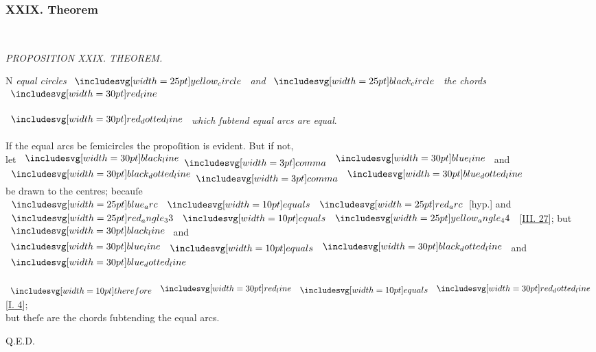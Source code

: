 \documentclass[11pt,preview]{standalone}
\begin{document}
\subsubsection{XXIX. Theorem}

\begin{minipage}[t]{0.43\textwidth}
    \vspace{20pt}
    
    \hfill\\
    
\end{minipage}%
\hfill
\begin{minipage}[t]{0.54\textwidth}
    \begin{center}
        \textit{PROPOSITION XXIX. THEOREM.}\label{book3pr29} \\
    \end{center}

    \hfill

    \begin{center}
        \raggedright \lettrine[lines=3, loversize=1, nindent=0pt]{}{}N \textit{equal circles} $\img{yellow_circle}$ \textit{and} $\img{black_circle}$ \textit{the chords} $\redline$
    \end{center}
    $\dottedredline$ \textit{which ſubtend equal arcs are equal}.

    \hfill

    \hfill

    \begin{center}
        If the equal arcs be ſemicircles the propoſition is evident. But if not,\\
        let $\blackline \bcomma \blueline$ and $\dottedblackline \bcomma \dottedblueline$\\
        be drawn to the centres; becauſe $\img{blue_arc} \bequals \img{red_arc}$[hyp.] and $\img{red_angle_33} \bequals \img{yellow_angle_44}$ [\hyperref[book3pr27]{\textsc{III.} 27}]; but $\blackline$ and  $\blueline \bequals \dottedblackline$ and $\dottedblueline$
    \end{center}
\end{minipage}%

\hfill

\begin{center}
    $\btherefore \redline \bequals \dottedredline$ [\hyperref[book1pr4]{\textsc{I.} 4}];\\
    but theſe are the chords ſubtending the equal arcs.
\end{center}

\hfill

\hfill Q.E.D.
\end{document}

